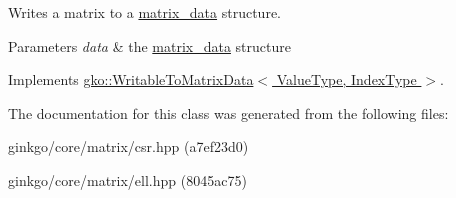 Writes a matrix to a \hyperlink{structgko_1_1matrix__data}{matrix\+\_\+data} structure. 


\begin{DoxyParams}{Parameters}
{\em data} & the \hyperlink{structgko_1_1matrix__data}{matrix\+\_\+data} structure \\
\hline
\end{DoxyParams}


Implements \hyperlink{classgko_1_1WritableToMatrixData_a96036c3a4bf4c67fa93002808b8b14e2}{gko\+::\+Writable\+To\+Matrix\+Data$<$ Value\+Type, Index\+Type $>$}.



The documentation for this class was generated from the following files\+:\begin{DoxyCompactItemize}
\item 
ginkgo/core/matrix/csr.\+hpp (a7ef23d0)\item 
ginkgo/core/matrix/ell.\+hpp (8045ac75)\end{DoxyCompactItemize}
